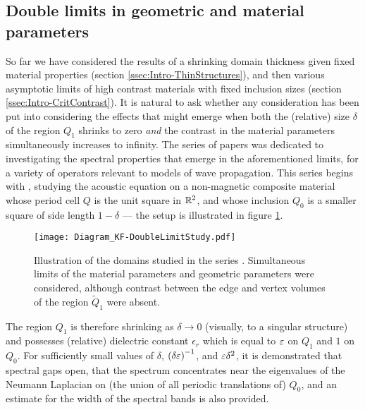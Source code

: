 \subsection{Double limits in geometric and material parameters} \label{ssec:Intro-DoubleLimits}
So far we have considered the results of a shrinking domain thickness given fixed material properties (section \ref{ssec:Intro-ThinStructures}), and then various asymptotic limits of high contrast materials with fixed inclusion sizes (section \ref{ssec:Intro-CritContrast}). 
It is natural to ask whether any consideration has been put into considering the effects that might emerge when both the (relative) size $\delta$ of the region $Q_1$ shrinks to zero \emph{and} the contrast in the material parameters simultaneously increases to infinity.
The series of papers \cite{figotin1996band-scalar, figotin1996band-maxwell, figotin1998spectral} was dedicated to investigating the spectral properties that emerge in the aforementioned limits, for a variety of operators relevant to models of wave propagation.
This series begins with \cite{figotin1996band-scalar}, studying the acoustic equation on a non-magnetic composite material whose period cell $Q$ is the unit square in $\mathbb{R}^2$, and whose inclusion $Q_0$ is a smaller square of side length $1-\delta$ --- the setup is illustrated in figure \ref{fig:Diagram_KF-DoubleLimitStudy}.
\begin{figure}[b!]
	\centering
	\texttt{[image: Diagram\_KF-DoubleLimitStudy.pdf]}
	\caption[Illustration of the domains studied in \cite{figotin1996band-scalar, figotin1996band-maxwell, figotin1998spectral}, under simultaneous limits of geometric- and material parameters.]{\label{fig:Diagram_KF-DoubleLimitStudy} Illustration of the domains studied in the series \cite{figotin1996band-scalar, figotin1996band-maxwell, figotin1998spectral}. Simultaneous limits of the material parameters and geometric parameters were considered, although contrast between the edge and vertex volumes of the region $\widetilde{Q}_1$ were absent.}
\end{figure}
The region $Q_1$ is therefore shrinking as $\delta\rightarrow0$ (visually, to a singular structure) and possesses (relative) dielectric constant $\epsilon_r$ which is equal to $\varepsilon$ on $Q_1$ and $1$ on $Q_0$.
For sufficiently small values of $\delta$, $\left( \delta\varepsilon \right)^{-1}$, and $\varepsilon\delta^2$, it is demonstrated that spectral gaps open, that the spectrum concentrates near the eigenvalues of the Neumann Laplacian on (the union of all periodic translations of) $Q_0$, and an estimate for the width of the spectral bands is also provided.
